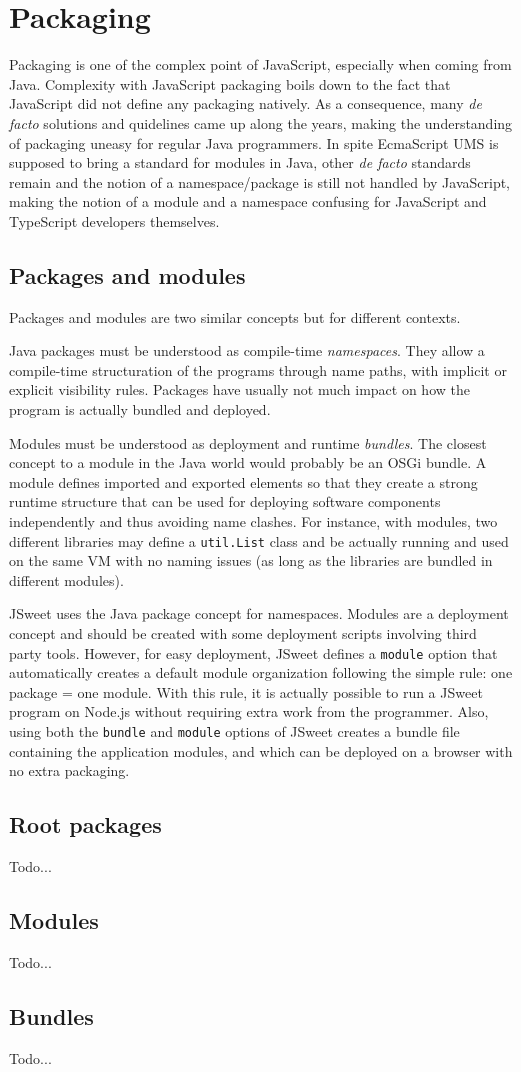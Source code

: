 \documentclass[a4paper]{report}
\begin{document}
\chapter{Packaging}
\label{packaging}

Packaging is one of the complex point of JavaScript, especially when coming from Java. Complexity with JavaScript packaging boils down to the fact that JavaScript did not define any packaging natively. As a consequence, many \emph{de facto} solutions and quidelines came up along the years, making the understanding of packaging uneasy for regular Java programmers. In spite EcmaScript UMS is supposed to bring a standard for modules in Java, other \emph{de facto} standards remain and the notion of a namespace/package is still not handled by JavaScript, making the notion of a module and a namespace confusing for JavaScript and TypeScript developers themselves.

\section{Packages and modules}

Packages and modules are two similar concepts but for different contexts.

Java packages must be understood as compile-time \emph{namespaces}. They allow a compile-time structuration of the programs through name paths, with implicit or explicit visibility rules. Packages have usually not much impact on how the program is actually bundled and deployed.

Modules must be understood as deployment and runtime \emph{bundles}. The closest concept to a module in the Java world would probably be an OSGi bundle. A module defines imported and exported elements so that they create a strong runtime structure that can be used for deploying software components independently and thus avoiding name clashes. For instance, with modules, two different libraries may define a \texttt{util.List} class and be actually running and used on the same VM with no naming issues (as long as the libraries are bundled in different modules).

JSweet uses the Java package concept for namespaces. Modules are a deployment concept and should be created with some deployment scripts involving third party tools. However, for easy deployment, JSweet defines a \texttt{module} option that automatically creates a default module organization following the simple rule: one package = one module. With this rule, it is actually possible to run a JSweet program on Node.js without requiring extra work from the programmer. Also, using both the \texttt{bundle} and \texttt{module} options of JSweet creates a bundle file containing the application modules, and which can be deployed on a browser with no extra packaging.

\section{Root packages}

Todo...

\section{Modules}

Todo...

\section{Bundles}

Todo...
\end{document}
